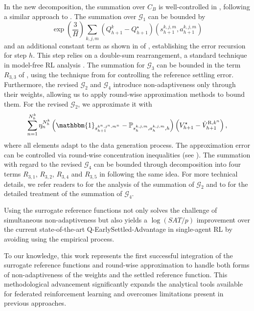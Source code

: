 \documentclass{article}
\newcommand{\R}{\textnormal{R}}
\begin{document}
In the new decomposition, the summation over $C_B$ is well-controlled in , following a similar approach to \cite[Appendix E.2]{li2023breaking}. The summation over $\mathcal{G}_1$ can be bounded by $$\exp\left(\frac{3}{H}\right)\sum_{k,j,m}\left(Q_{h+1}^k-Q_{h+1}^\star\right)(s_{h+1}^{k,j,m},a_{h+1}^{k,j,m})$$ and an additional constant term as shown in  of , establishing the error recursion for step $h$. This step relies on a double-sum rearrangement, a standard technique in model-free RL analysis \cite{jin2018q,li2023breaking, zheng2023federated}. The summation for $\mathcal{G}_3$ can be bounded in the term $R_{3,3}$ of , using the technique from \cite[Lemma 3]{li2023breaking} for controlling the reference settling error.  Furthermore, the revised $\mathcal{G}_2$ and $\mathcal{G}_4$ introduce non-adaptiveness only through their weights, allowing us to apply round-wise approximation methods \citep{zheng2023federated} to bound them. For the revised $\mathcal{G}_2$, we approximate it with $$\sum_{n=1}^{N_h^k} \eta_n^{N_h^k}\left(\mathbbm{1}_{s_{h+1}^{k^n,j^n,m^n}}-\mathbb{P}_{s_h^{k,j,m}, a_h^{k,j,m},h}\right)\left(V_{h+1}^{\star}-\hat{V}_{h+1}^{\R,k^n}\right),$$ where all elements adapt to the data generation process. The approximation error can be controlled via round-wise concentration inequalities (see ). The summation with regard to the revised $\mathcal{G}_4$ can be bounded through decomposition into four terms $R_{3,1}$, $R_{3,2}$, $R_{3,4}$ and $R_{3,5}$ in  following the same idea. For more technical details, we refer readers to  for the analysis of the summation of $\mathcal{G}_2$ and to  for the detailed treatment of the summation of $\mathcal{G}_4$.

Using the surrogate reference functions not only solves the challenge of simultaneous non-adaptiveness but also yields a $\log(SAT/p)$ improvement over the current state-of-the-art Q-EarlySettled-Advantage \cite{li2023breaking} in single-agent RL by avoiding using the empirical process.

To our knowledge, this work represents the first successful integration of the surrogate reference functions and round-wise approximation to handle both forms of non-adaptiveness of the weights and the settled reference function. This methodological advancement significantly expands the analytical tools available for federated reinforcement learning and overcomes limitations present in previous approaches.
\end{document}
